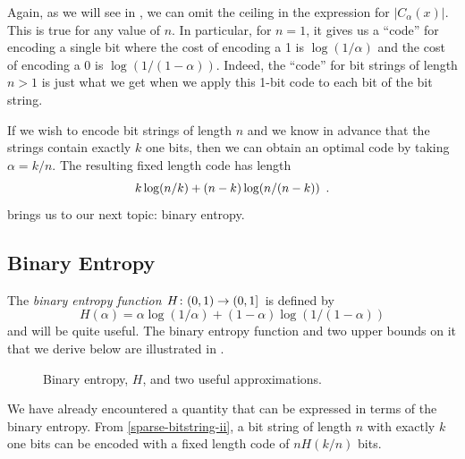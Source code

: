 \documentclass{patmorin}
\begin{document}
Again, as we will see in , we can omit the ceiling in the
expression for $|C_\alpha(x)|$.  This is true for any value of $n$. In
particular, for $n=1$, it gives us a ``code'' for encoding a single
bit where the cost of encoding a 1 is $\log(1/\alpha)$ and the cost of
encoding a 0 is $\log(1/(1-\alpha))$.  Indeed, the ``code'' for bit
strings of length $n>1$ is just what we get when we apply this 1-bit
code to each bit of the bit string.

If we wish to encode bit strings of length $n$ and we know in advance
that the strings contain exactly $k$ one bits, then we can obtain
an optimal code 
by taking $\alpha=k/n$. The resulting fixed length
code has length
\begin{equation}
  k\log (n/k) + (n-k)\log(n/(n-k))  \eqlabel{sparse-bitstring-ii} \enspace .
\end{equation}
 brings us to our next topic: binary entropy.

\subsection{Binary Entropy}

The \emph{binary entropy function} $H\colon (0,1)\to(0,1]$ is defined
by
\[
  H(\alpha) = \alpha\log(1/\alpha) + (1-\alpha)\log(1/(1-\alpha)) 
\]
and will be quite useful.  The binary entropy function and two upper
bounds on it that we derive below are illustrated in .

\begin{figure}
  \caption{Binary entropy, $H$, and two useful approximations.}
\end{figure}

We have already encountered a quantity that can be
expressed in terms of the binary entropy.  From
\eqref{sparse-bitstring-ii}, a bit string of length $n$ with
exactly $k$ one bits can be encoded with a fixed length code of 
$nH(k/n)$ bits.
\end{document}
